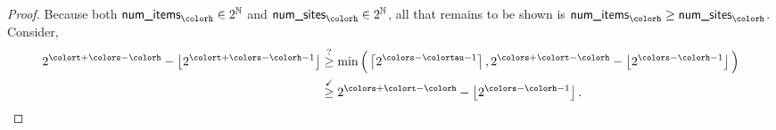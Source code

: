 \begin{proof}
Because both $\textsf{num\_items}_{\colorh} \in 2^{\mathbb{N}}$ and $\textsf{num\_sites}_{\colorh} \in 2^{\mathbb{N}}$, all that remains to be shown is $\textsf{num\_items}_{\colorh} \geq \textsf{num\_sites}_{\colorh}$.
Consider,
\begin{align*}
2^{\colort + \colors - \colorh} - \left\lfloor2^{\colort + \colors - \colorh - 1} \right\rfloor
&\stackrel{?}{\geq}
\min\Big(
\left\lceil 2^{\colors - \colortau - 1} \right\rceil,
2^{\colors + \colort - \colorh} - \left\lfloor 2^{\colors - \colorh - 1} \right\rfloor
\Big)\\
&\stackrel{\checkmark}{\geq}
2^{\colors + \colort - \colorh} - \left\lfloor 2^{\colors - \colorh - 1} \right\rfloor.
\end{align*}
\end{proof}
